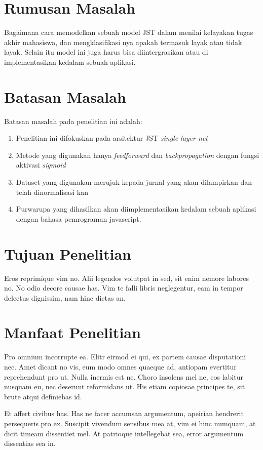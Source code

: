 \section{Rumusan Masalah}
Bagaimana cara memodelkan sebuah model JST dalam menilai kelayakan tugas akhir mahasiswa, dan mengklasifikasi nya apakah termasuk layak atau tidak layak. Selain itu model ini juga harus bisa diintergrasikan atau di implementasikan kedalam sebuah aplikasi. 


\section{Batasan Masalah}
Batasan masalah pada penelitian ini adalah:
\begin{enumerate}
\item Penelitian ini difokuskan pada arsitektur JST \emph{single layer net}
\item Metode yang digunakan hanya \emph{feedforward} dan \emph{backpropagation} dengan fungsi aktivasi \emph{sigmoid}
\item Dataset yang digunakan merujuk kepada jurnal yang akan dilampirkan dan telah dinormalisasi kan\cite{ImplementasiJaringanSyarafTiruanUntukMenilaiKelayakanTugasAkhirMahasiswaStudiKasusDiAmikBukittinggi} 
\item Purwarupa yang dihasilkan akan diimplementasikan kedalam sebuah aplikasi dengan bahasa pemrograman javascript.
\end{enumerate}


\section{Tujuan Penelitian}
Eros reprimique vim no. Alii legendos volutpat in sed, sit enim nemore labores no. No odio decore causae has. Vim te falli libris neglegentur, eam in tempor delectus dignissim, nam hinc dictas an.


\section{Manfaat Penelitian}
Pro omnium incorrupte ea. Elitr eirmod ei qui, ex partem causae disputationi nec. Amet dicant no vis, eum modo omnes quaeque ad, antiopam evertitur reprehendunt pro ut. Nulla inermis est ne. Choro insolens mel ne, eos labitur nusquam eu, nec deserunt reformidans ut. His etiam copiosae principes te, sit brute atqui definiebas id.

Et affert civibus has. Has ne facer accumsan argumentum, apeirian hendrerit persequeris pro ex. Suscipit vivendum sensibus mea at, vim ei hinc numquam, at dicit timeam dissentiet mel. At patrioque intellegebat sea, error argumentum dissentias sea in.



\begin{comment}

\end{comment}
